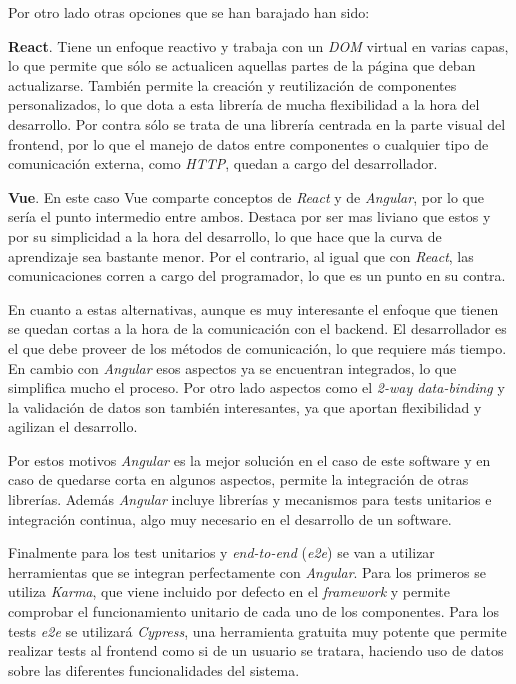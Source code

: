 \bigskip
Por otro lado otras opciones que se han barajado han sido:

\textbf{React}. Tiene un enfoque reactivo y trabaja con un \textit{DOM} virtual en varias capas, lo que permite que sólo se actualicen aquellas partes de la página que deban actualizarse. También permite la creación y reutilización de componentes personalizados, lo que dota a esta librería de mucha flexibilidad a la hora del desarrollo. Por contra sólo se trata de una librería centrada en la parte visual del frontend, por lo que el manejo de datos entre componentes o cualquier tipo de comunicación externa, como \textit{HTTP}, quedan a cargo del desarrollador.

\textbf{Vue}. En este caso Vue comparte conceptos de \textit{React} y de \textit{Angular}, por lo que sería el punto intermedio entre ambos. Destaca por ser mas liviano que estos y por su simplicidad a la hora del desarrollo, lo que hace que la curva de aprendizaje sea bastante menor. Por el contrario, al igual que con \textit{React}, las comunicaciones corren a cargo del programador, lo que es un punto en su contra.

\bigskip
En cuanto a estas alternativas, aunque es muy interesante el enfoque que tienen se quedan cortas a la hora de la comunicación con el backend. El desarrollador es el que debe proveer de los métodos de comunicación, lo que requiere más tiempo. En cambio con \textit{Angular} esos aspectos ya se encuentran integrados, lo que simplifica mucho el proceso. Por otro lado aspectos como el \textit{2-way data-binding} y la validación de datos son también interesantes, ya que aportan flexibilidad y agilizan el desarrollo.

Por estos motivos \textit{Angular} es la mejor solución en el caso de este software y en caso de quedarse corta en algunos aspectos, permite la integración de otras librerías. Además \textit{Angular} incluye librerías y mecanismos para tests unitarios e integración continua, algo muy necesario en el desarrollo de un software.

Finalmente para los test unitarios y \textit{end-to-end} (\textit{e2e}) se van a utilizar herramientas que se integran perfectamente con \textit{Angular}. Para los primeros se utiliza \textit{Karma}, que viene incluido por defecto en el \textit{framework} y permite comprobar el funcionamiento unitario de cada uno de los componentes. Para los tests \textit{e2e} se utilizará \textit{Cypress}, una herramienta gratuita muy potente que permite realizar tests al frontend como si de un usuario se tratara, haciendo uso de datos sobre las diferentes funcionalidades del sistema.






